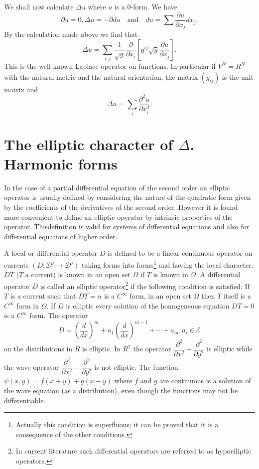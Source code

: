 We shall now calculate $\Delta u$ where $u$ is a $0$-form. We have
$$
\partial u=0, \Delta u=-\partial du\quad\text{and}\quad
du=\sum\dfrac{\partial u}{\partial x_{j}}dx_{j}.
$$
By the calculation made above we find that
$$
\Delta u=\sum_{i,j} \frac{1}{\sqrt{g}}\frac{\partial}{\partial
  x_{i}}\left[g^{ij}\sqrt{g}\frac{\partial u}{\partial x_{j}}\right].
$$
This is the well-known Laplace operator on functions. In particular if
$V^{N}=R^{N}$ with the natural metric and the natural orientation, the
matrix $(g_{ij})$ is the unit matrix and
$$
\Delta u=\sum_{i}\frac{\partial^{2}u}{\partial x^{2}_{i}}.
$$

\section*{The elliptic character of $\Delta$. Harmonic forms}

In the case of a partial differential equation of the second order an
elliptic operator is usually defined by considering the nature of the
quadratic form given by the coefficients of the derivatives of the
second order. However it is found more convenient to define an
elliptic operator by intrinsic properties of the operator.
This\pageoriginale definition is valid for systems of differential
equations and also for differential equations of higher order.

A local or differential operator $D$ is defined to be a linear
continuous operator on currents $(D:\mathscr{D}'\to \mathscr{D}')$
taking forms into forms\footnote{Actually this condition is
  superfluous; it can be proved that it is a consequence of the other
  conditions.} and having the local character: $DT$ ($T$ a current) is
known in an open set $\Omega$ if $T$ is known in $\Omega$. A
differential operator $D$ is called an elliptic operator\footnote{In
  current literature such differential operators are referred to as
  hypoelliptic operators.} if
the following condition is satisfied: If $T$ is a current such that
$DT=\alpha$ is a $C^{\infty}$ form, in an open set $\Omega$ then $T$
itself is a $C^{\infty}$ form in $\Omega$. If $D$ is elliptic every
solution of the homogeneous equation $DT=0$ is a $C^{\infty}$
form. The operator
$$
D=\left(\frac{d}{dx}\right)^{m}+a_{1}\left(\frac{d}{dx}\right)^{m-1} +
\cdots+a_{m},a_{i}\in\mathscr{E} 
$$
on the distributions in $R$ is elliptic. In $R^{2}$ the operator
$\dfrac{\partial^{2}}{\partial x^{2}}+\dfrac{\partial^{2}}{\partial
  y^{2}}$ is elliptic while the wave operator
$\dfrac{\partial^{2}}{\partial x^{2}}-\dfrac{\partial^{2}}{\partial
  y^{2}}$ is not elliptic. The function $\psi(x,y)=f(x+y)+g(x-y)$
where $f$ and $g$ are continuous is a solution of the wave equation
(as a distribution), even though the functions may not be
differentiable.

